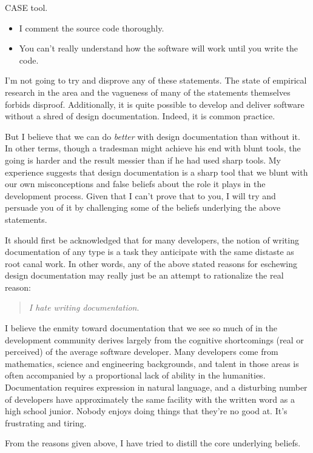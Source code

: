 \documentclass{article}
\begin{document}
CASE tool.

\begin{itemize}
\item I comment the source code thoroughly.
\item You can't really understand how the software will work until you
write the code.
\end{itemize}

I'm not going to try and disprove any of these statements. The state of
empirical research in the area and the vagueness of many of the
statements themselves forbids disproof. Additionally, it is quite
possible to develop and deliver software without a shred of design
documentation. Indeed, it is common practice.

But I believe that we can do \emph{better} with design documentation than
without it. In other terms, though a tradesman might achieve his end
with blunt tools, the going is harder and the result messier than if he
had used sharp tools. My experience suggests that design documentation
is a sharp tool that we blunt with our own misconceptions and false
beliefs about the role it plays in the development process. Given that I
can't prove that to you, I will try and persuade you of it by
challenging some of the beliefs underlying the above statements.

It should first be acknowledged that for many developers, the notion of
writing documentation of any type is a task they anticipate with the
same distaste as root canal work. In other words, any of the above
stated reasons for eschewing design documentation may really just be an
attempt to rationalize the real reason:

\begin{quote}
\emph{I hate writing documentation}.
\end{quote}

I believe the enmity toward documentation that we see so much of in the
development community derives largely from the cognitive shortcomings
(real or perceived) of the average software developer. Many developers
come from mathematics, science and engineering backgrounds, and talent
in those areas is often accompanied by a proportional lack of ability in
the humanities. Documentation requires expression in natural language,
and a disturbing number of developers have approximately the same
facility with the written word as a high school junior. Nobody enjoys
doing things that they're no good at. It's frustrating and tiring.

From the reasons given above, I have tried to distill the core
underlying beliefs.
\end{document}
